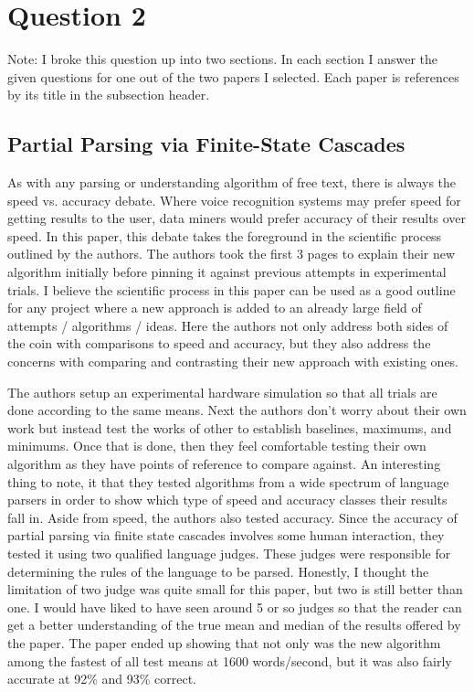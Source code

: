 \documentclass[conference]{IEEEtran}
\begin{document}
\section{Question 2}

Note: I broke this question up into two sections. In each section I answer the given questions for one out of the two papers I 
selected. Each paper is references by its title in the subsection header.

\subsection{Partial Parsing via Finite-State Cascades}

As with any parsing or understanding algorithm of free text, there is always the speed vs. accuracy debate. Where voice recognition systems
may prefer speed for getting results to the user, data miners would prefer accuracy of their results over speed. In this paper, this
debate takes the foreground in the scientific process outlined by the authors. The authors took the first 3 pages to explain their new
algorithm initially before pinning it against previous attempts in experimental trials. I believe the scientific process in this paper
can be used as a good outline for any project where a new approach is added to an already large field of attempts / algorithms / ideas. Here
the authors not only address both sides of the coin with comparisons to speed and accuracy, but they also address the concerns with comparing
and contrasting their new approach with existing ones. 

The authors setup an experimental hardware simulation so that all trials are done according to the same means. Next the authors don't
worry about their own work but instead test the works of other to establish baselines, maximums, and minimums. Once that is done, then
they feel comfortable testing their own algorithm as they have points of reference to compare against. An interesting thing to note, it
that they tested algorithms from a wide spectrum of language parsers in order to show which type of speed and accuracy classes their results
fall in. Aside from speed, the authors also tested accuracy. Since the accuracy of partial parsing via finite state cascades involves some
human interaction, they tested it using two qualified language judges. These judges were responsible for determining the rules of the language
to be parsed. Honestly, I thought the limitation of two judge was quite small for this paper, but two is still better than one. I would
have liked to have seen around 5 or so judges so that the reader can get a better understanding of the true mean and median of the results
offered by the paper. The paper ended up showing that not only was the new algorithm among the fastest of all test means at 1600 words/second,
but it was also fairly accurate at 92\% and 93\% correct.
\end{document}
